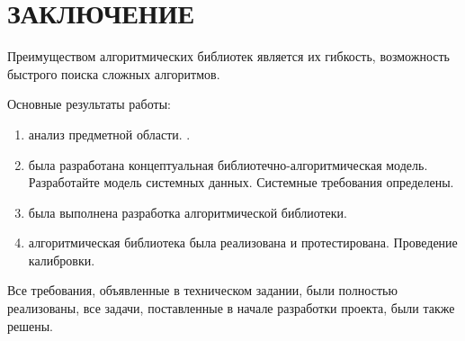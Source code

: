 \section*{ЗАКЛЮЧЕНИЕ}

Преимуществом алгоритмических библиотек является их гибкость, возможность быстрого поиска сложных алгоритмов.


Основные результаты работы:

\begin{enumerate}
	\item анализ предметной области. .
	\item была разработана концептуальная библиотечно-алгоритмическая модель. Разработайте модель системных данных. Системные требования определены.
	\item  была выполнена разработка алгоритмической библиотеки.
	\item  алгоритмическая библиотека была реализована и протестирована. Проведение
	калибровки.
	
\end{enumerate}

Все требования, объявленные в техническом задании, были полностью реализованы, все задачи, поставленные в начале разработки проекта, были также решены.
